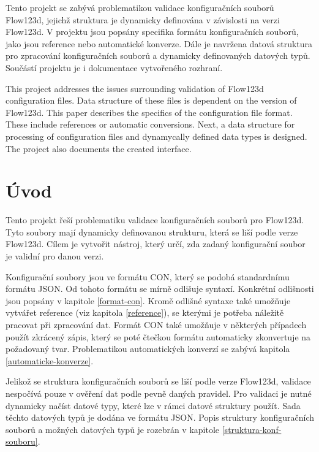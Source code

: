 \documentclass[FM,MP]{tulthesis}
\begin{document}
\renewcommand{\thetable}{\arabic{table}}
\renewcommand{\thefigure}{\arabic{figure}}


\begin{abstractCZ}
	Tento projekt se zabývá problematikou validace konfiguračních souborů Flow123d, jejichž struktura je dynamicky definována v závislosti na verzi Flow123d. V projektu jsou popsány specifika formátu konfiguračních souborů, jako jsou reference nebo automatické konverze. Dále je navržena datová struktura pro zpracování konfiguračních souborů a dynamicky definovaných datových typů. Součástí projektu je i dokumentace vytvořeného rozhraní.
\end{abstractCZ}
\vspace{2cm}
\begin{abstractEN}
	This project addresses the issues surrounding validation of Flow123d configuration files. Data structure of these files is dependent on the version of Flow123d. This paper describes the specifics of the configuration file format. These include references or automatic conversions. Next, a data structure for processing of configuration files and dynamycally defined data types is designed. The project also documents the created interface.
\end{abstractEN}

\tableofcontents
\clearpage

\chapter{Úvod}
	Tento projekt řeší problematiku validace konfiguračních souborů pro Flow123d. Tyto soubory mají dynamicky definovanou strukturu, která se liší podle verze Flow123d. Cílem je vytvořit nástroj, který určí, zda zadaný konfigurační soubor je validní pro danou verzi.

	Konfigurační soubory jsou ve formátu CON, který se podobá standardnímu formátu JSON. Od tohoto formátu se mírně odlišuje syntaxí. Konkrétní odlišnosti jsou popsány v kapitole \ref{format-con}. Kromě odlišné syntaxe také umožňuje vytvářet reference (viz kapitola \ref{reference}), se kterými je potřeba náležitě pracovat při zpracování dat. Formát CON také umožňuje v některých případech použít zkrácený zápis, který se poté čtečkou formátu automaticky zkonvertuje na požadovaný tvar. Problematikou automatických konverzí se zabývá kapitola \ref{automaticke-konverze}.

	Jelikož se struktura konfiguračních souborů se liší podle verze Flow123d, validace nespočívá pouze v ověření dat podle pevně daných pravidel. Pro validaci je nutné dynamicky načíst datové typy, které lze v rámci datové struktury použít. Sada těchto datových typů je dodána ve formátu JSON. Popis struktury konfiguračních souborů a možných datových typů je rozebrán v kapitole \ref{struktura-konf-souboru}.
\end{document}
